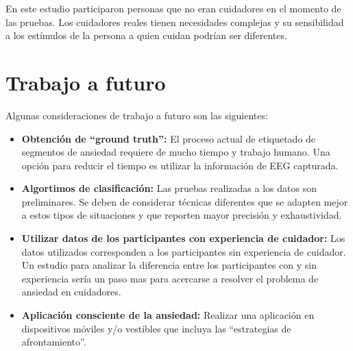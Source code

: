 	En este estudio participaron personas que no eran cuidadores en el momento de las pruebas. Los cuidadores reales tienen necesidades complejas y su sensibilidad a los est\'imulos de la persona a quien cuidan podr\'ian ser diferentes.
\section{Trabajo a futuro}
Algunas consideraciones de trabajo a futuro son las siguientes:

\begin{itemize}
	\item \textbf{Obtenci\'on de ``ground truth'':} El proceso actual de etiquetado de segmentos de ansiedad requiere de mucho tiempo y trabajo humano. Una opci\'on para reducir el tiempo es utilizar la informaci\'on de EEG capturada.
	\item \textbf{Algortimos de clasificaci\'on:} Las pruebas realizadas a los datos son preliminares. Se deben de considerar t\'ecnicas diferentes que se adapten mejor a estos tipos de situaciones y que reporten mayor precisi\'on y exhaustividad.
	\item \textbf{Utilizar datos de los participantes con experiencia de cuidador:} Los datos utilizados corresponden a los participantes sin experiencia de cuidador. Un estudio para analizar la diferencia entre los participantes con y sin experiencia ser\'ia un paso mas para acercarse a resolver el problema de ansiedad en cuidadores.
	\item \textbf{Aplicaci\'on consciente de la ansiedad:} Realizar una aplicaci\'on en dispositivos m\'oviles y/o vestibles que incluya las ``estrategias de afrontamiento''.
\end{itemize}

